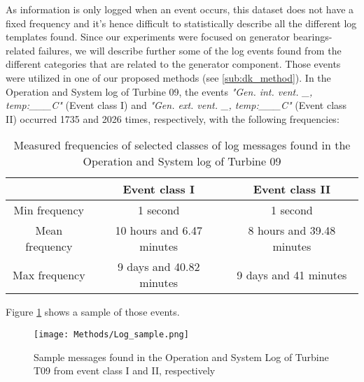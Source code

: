   \par As information is only logged when an event occurs, this dataset does not have a fixed frequency and it's hence difficult to statistically describe all the different 
  log templates found. Since our experiments were focused on generator bearings-related failures, we will describe further some of the log events found from the different
  categories that are related to the generator component. Those events were utilized in one of our proposed methods (see \ref{sub:dk_method}).
  In the Operation and System log of Turbine 09, the events \emph{"Gen. int. vent. \_, temp:\_\_\_\degree C"} (Event class I) and \emph{"Gen. ext. vent. \_, temp:\_\_\_\degree C"} (Event class II)
  occurred 1735 and 2026 times, respectively, with the following frequencies:
  \begin{table}[H]
    \centering
    \begin{tabular}{cc|c|}
      \cline{2-3}
      \multicolumn{1}{c|}{} & \textbf{Event class I} & \textbf{Event class II} \\
      \hline
      \multicolumn{1}{|c|}{Min frequency} & 1 second & 1 second \\
      \hline
      \multicolumn{1}{|c|}{Mean frequency} & 10 hours and 6.47 minutes & 8 hours and 39.48 minutes \\
      \hline
      \multicolumn{1}{|c|}{Max frequency} & 9 days and 40.82 minutes & 9 days and 41 minutes \\
      \hline
    \end{tabular}
    \caption{Measured frequencies of selected classes of log messages found in the Operation and System log of Turbine 09}
    \label{tab:OpSysLogsT09}
  \end{table}

  \begin{flushleft}
  Figure \ref{fig:sample_logs} shows a sample of those events.
  \end{flushleft}

  \begin{figure}[H]
    \begin{center}
      \texttt{[image: Methods/Log\_sample.png]}
    \end{center}
    \caption{Sample messages found in the Operation and System Log of Turbine T09 from event class I and II, respectively}
    \label{fig:sample_logs}
  \end{figure}

